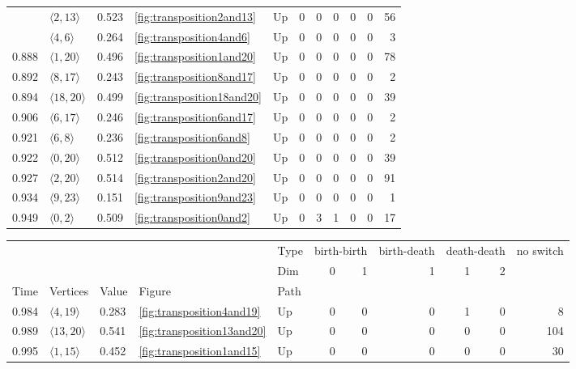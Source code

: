 \documentclass{article}
\begin{document}
\begin{center}
\begin{tabular}{lllllrrrrrr}
 & $\langle2, 13\rangle$ & 0.523 & \ref{fig:transposition2and13} & Up & 0 & 0 & 0 & 0 & 0 & 56 \\
\cline{2-11} \cline{3-11} \cline{4-11}
 & $\langle4, 6\rangle$ & 0.264 & \ref{fig:transposition4and6} & Up & 0 & 0 & 0 & 0 & 0 & 3 \\
\cline{1-11} \cline{2-11} \cline{3-11} \cline{4-11}
0.888 & $\langle1, 20\rangle$ & 0.496 & \ref{fig:transposition1and20} & Up & 0 & 0 & 0 & 0 & 0 & 78 \\
\cline{1-11} \cline{2-11} \cline{3-11} \cline{4-11}
0.892 & $\langle8, 17\rangle$ & 0.243 & \ref{fig:transposition8and17} & Up & 0 & 0 & 0 & 0 & 0 & 2 \\
\cline{1-11} \cline{2-11} \cline{3-11} \cline{4-11}
0.894 & $\langle18, 20\rangle$ & 0.499 & \ref{fig:transposition18and20} & Up & 0 & 0 & 0 & 0 & 0 & 39 \\
\cline{1-11} \cline{2-11} \cline{3-11} \cline{4-11}
0.906 & $\langle6, 17\rangle$ & 0.246 & \ref{fig:transposition6and17} & Up & 0 & 0 & 0 & 0 & 0 & 2 \\
\cline{1-11} \cline{2-11} \cline{3-11} \cline{4-11}
0.921 & $\langle6, 8\rangle$ & 0.236 & \ref{fig:transposition6and8} & Up & 0 & 0 & 0 & 0 & 0 & 2 \\
\cline{1-11} \cline{2-11} \cline{3-11} \cline{4-11}
0.922 & $\langle0, 20\rangle$ & 0.512 & \ref{fig:transposition0and20} & Up & 0 & 0 & 0 & 0 & 0 & 39 \\
\cline{1-11} \cline{2-11} \cline{3-11} \cline{4-11}
0.927 & $\langle2, 20\rangle$ & 0.514 & \ref{fig:transposition2and20} & Up & 0 & 0 & 0 & 0 & 0 & 91 \\
\cline{1-11} \cline{2-11} \cline{3-11} \cline{4-11}
0.934 & $\langle9, 23\rangle$ & 0.151 & \ref{fig:transposition9and23} & Up & 0 & 0 & 0 & 0 & 0 & 1 \\
\cline{1-11} \cline{2-11} \cline{3-11} \cline{4-11}
0.949 & $\langle0, 2\rangle$ & 0.509 & \ref{fig:transposition0and2} & Up & 0 & 3 & 1 & 0 & 0 & 17 \\
\cline{1-11} \cline{2-11} \cline{3-11} \cline{4-11}
\bottomrule
\end{tabular}

\begin{tabular}{lllllrrrrrr}
\toprule
 &  &  &  & Type & \multicolumn{2}{r}{birth-birth} & birth-death & \multicolumn{2}{r}{death-death} & no switch \\
 &  &  &  & Dim & 0 & 1 & 1 & 1 & 2 &  \\
Time & Vertices & Value & Figure & Path &  &  &  &  &  &  \\
\midrule
0.984 & $\langle4, 19\rangle$ & 0.283 & \ref{fig:transposition4and19} & Up & 0 & 0 & 0 & 1 & 0 & 8 \\
\cline{1-11} \cline{2-11} \cline{3-11} \cline{4-11}
0.989 & $\langle13, 20\rangle$ & 0.541 & \ref{fig:transposition13and20} & Up & 0 & 0 & 0 & 0 & 0 & 104 \\
\cline{1-11} \cline{2-11} \cline{3-11} \cline{4-11}
0.995 & $\langle1, 15\rangle$ & 0.452 & \ref{fig:transposition1and15} & Up & 0 & 0 & 0 & 0 & 0 & 30 \\
\cline{1-11} \cline{2-11} \cline{3-11} \cline{4-11}
\bottomrule
\end{tabular}


\end{center}
\end{document}
